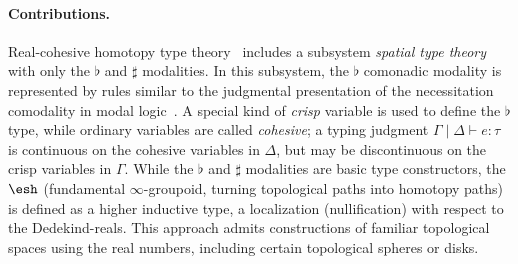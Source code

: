 \documentclass{article}
\begin{document}
{%
  


\paragraph{Contributions.} Real-cohesive homotopy type
theory~\citep{Shulman2015} includes a subsystem \emph{spatial type theory} with
only the $\flat$ and $\sharp$ modalities. In this subsystem, the $\flat$
comonadic modality is represented by rules similar to the judgmental
presentation of the necessitation comodality in modal
logic~\citep{Pfenning2001}. A special kind of \emph{crisp} variable is used to
define the $\flat$ type, while ordinary variables are called \emph{cohesive}; a
typing judgment $\Gamma \mid \Delta \vdash e : \tau$ is continuous on the
cohesive variables in $\Delta$, but may be discontinuous on the crisp variables
in $\Gamma$. While the $\flat$ and $\sharp$ modalities are basic type
constructors, the $\shape$ (fundamental $\infty$-groupoid, turning topological
paths into homotopy paths) is defined as a higher inductive type, a localization
(nullification) with respect to the Dedekind-reals. This approach admits
constructions of familiar topological spaces using the real numbers, including
certain topological spheres or disks.

}
\end{document}
